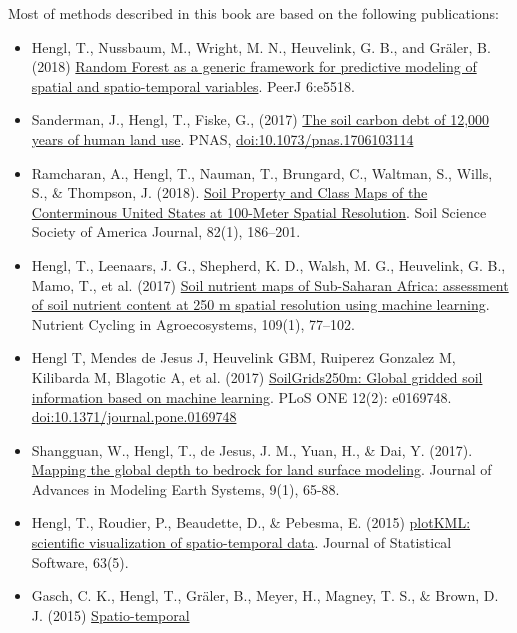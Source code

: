 \documentclass[graybox,natbib,nospthms]{svmono}
\begin{document}
Most of methods described in this book are based on the following
publications:

\begin{itemize}
\item
  Hengl, T., Nussbaum, M., Wright, M. N., Heuvelink, G. B., and Gräler,
  B. (2018) \href{https://doi.org/10.7717/peerj.5518}{Random Forest as a
  generic framework for predictive modeling of spatial and
  spatio-temporal variables}. PeerJ 6:e5518.
\item
  Sanderman, J., Hengl, T., Fiske, G., (2017)
  \href{http://www.pnas.org/content/early/2017/08/15/1706103114.full}{The
  soil carbon debt of 12,000 years of human land use}. PNAS,
  \url{doi:10.1073/pnas.1706103114}
\item
  Ramcharan, A., Hengl, T., Nauman, T., Brungard, C., Waltman, S.,
  Wills, S., \& Thompson, J. (2018).
  \href{https://dl.sciencesocieties.org/publications/sssaj/abstracts/82/1/186}{Soil
  Property and Class Maps of the Conterminous United States at 100-Meter
  Spatial Resolution}. Soil Science Society of America Journal, 82(1),
  186--201.
\item
  Hengl, T., Leenaars, J. G., Shepherd, K. D., Walsh, M. G., Heuvelink,
  G. B., Mamo, T., et al. (2017)
  \href{https://link.springer.com/article/10.1007/s10705-017-9870-x}{Soil
  nutrient maps of Sub-Saharan Africa: assessment of soil nutrient
  content at 250 m spatial resolution using machine learning}. Nutrient
  Cycling in Agroecosystems, 109(1), 77--102.
\item
  Hengl T, Mendes de Jesus J, Heuvelink GBM, Ruiperez Gonzalez M,
  Kilibarda M, Blagotic A, et al. (2017)
  \href{http://dx.doi.org/10.1371/journal.pone.0169748}{SoilGrids250m:
  Global gridded soil information based on machine learning}. PLoS ONE
  12(2): e0169748. \url{doi:10.1371/journal.pone.0169748}
\item
  Shangguan, W., Hengl, T., de Jesus, J. M., Yuan, H., \& Dai, Y.
  (2017). \href{https://doi.org/10.1002/2016MS000686}{Mapping the global
  depth to bedrock for land surface modeling}. Journal of Advances in
  Modeling Earth Systems, 9(1), 65-88.
\item
  Hengl, T., Roudier, P., Beaudette, D., \& Pebesma, E. (2015)
  \href{https://www.jstatsoft.org/article/view/v063i05}{plotKML:
  scientific visualization of spatio-temporal data}. Journal of
  Statistical Software, 63(5).
\item
  Gasch, C. K., Hengl, T., Gräler, B., Meyer, H., Magney, T. S., \&
  Brown, D. J. (2015)
  \href{https://doi.org/10.1016/j.spasta.2015.04.001}{Spatio-temporal
}
\end{itemize}
\end{document}
